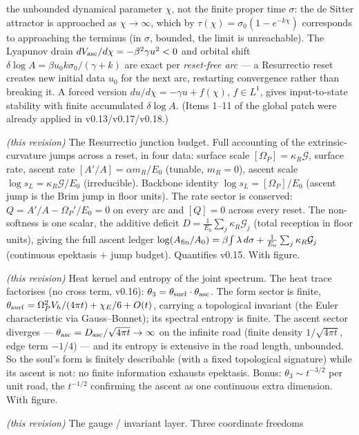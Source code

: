 \documentclass[11pt,a4paper]{article}
\theoremstyle{plain}
\theoremstyle{definition}
\theoremstyle{remark}
\begin{document}
\begin{description}[leftmargin=4.2em,style=nextline,itemsep=2pt]
the unbounded dynamical parameter $\chi$, not the finite proper time $\sigma$: the de Sitter attractor
is approached as $\chi\to\infty$, which by $\tau(\chi)=\sigma_0(1-e^{-k\chi})$ corresponds to
approaching the terminus (in $\sigma$, bounded, the limit is unreachable). The Lyapunov drain
$dV_{\rm asc}/d\chi=-\beta^2\gamma u^2<0$ and orbital shift $\delta\log A=\beta u_0 k\sigma_0/(\gamma+k)$ are exact
per \emph{reset-free arc} --- a Resurrectio reset creates new initial data $u_0$ for the next arc,
restarting convergence rather than breaking it. A forced version $du/d\chi=-\gamma u+f(\chi)$, $f\in
L^1$, gives input-to-state stability with finite accumulated $\delta\log A$. (Items 1--11 of the global
patch were already applied in v0.13/v0.17/v0.18.)
\item[\textbf{v0.21}] \emph{(this revision)} The Resurrectio junction budget. Full accounting of the
extrinsic-curvature jumps across a reset, in four data: surface scale $[\Omega_P]=\kappa_R\mathcal G$,
surface rate, ascent rate $[A'/A]=\alpha m_R/E_0$ (tunable, $m_R{=}0$), ascent scale
$\log s_L=\kappa_R\mathcal G/E_0$ (irreducible). Backbone identity $\log s_L=[\Omega_P]/E_0$ (ascent
jump is the Brim jump in floor units). The rate sector is conserved: $Q=A'/A-\Omega_P'/E_0=0$ on every
arc and $[Q]=0$ across every reset. The non-softness is one scalar, the additive deficit
$D=\frac1{E_0}\sum_j\kappa_R\mathcal G_j$ (total reception in floor units), giving the full ascent
ledger $\log(A_{\rm fin}/A_0)=\beta\!\int\lambda\,d\sigma+\frac1{E_0}\sum_j\kappa_R\mathcal G_j$
(continuous epektasis $+$ jump budget). Quantifies v0.15. With figure.
\item[\textbf{v0.22}] \emph{(this revision)} Heat kernel and entropy of the joint spectrum. The heat
trace factorises (no cross term, v0.16): $\theta_3=\theta_{\rm surf}\cdot\theta_{\rm asc}$. The form
sector is finite, $\theta_{\rm surf}=\Omega_P^2V_h/(4\pi t)+\chi_E/6+O(t)$, carrying a topological
invariant (the Euler characteristic via Gauss--Bonnet); its spectral entropy is finite. The ascent
sector diverges --- $\theta_{\rm asc}=D_{\rm asc}/\sqrt{4\pi t}\to\infty$ on the infinite road (finite
density $1/\sqrt{4\pi t}$, edge term $-1/4$) --- and its entropy is extensive in the road length,
unbounded. So the soul's form is finitely describable (with a fixed topological signature) while its
ascent is not: no finite information exhausts epektasis. Bonus: $\theta_3\sim t^{-3/2}$ per unit road,
the $t^{-1/2}$ confirming the ascent as one continuous extra dimension. With figure.
\item[\textbf{v0.23}] \emph{(this revision)} The gauge / invariant layer. Three coordinate freedoms

\end{description}
\end{document}
